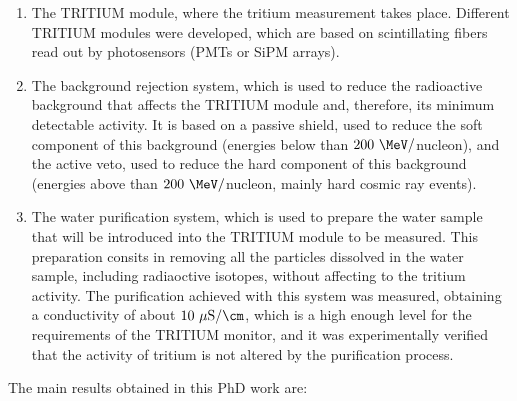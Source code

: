\begin{enumerate}

\item{} The TRITIUM module, where the tritium measurement takes place. Different TRITIUM modules were developed, which are based on scintillating fibers read out by photosensors (PMTs or SiPM arrays).

\item{} The background rejection system, which is used to reduce the radioactive background that affects the TRITIUM module and, therefore, its minimum detectable activity. It is based on a passive shield, used to reduce the soft component of this background (energies below than $200~\MeV/$nucleon), and the active veto, used to reduce the hard component of this background (energies above than $200~\MeV/$nucleon, mainly hard cosmic ray events).

\item{} The water purification system, which is used to prepare the water sample that will be introduced into the TRITIUM module to be measured. This preparation consits in removing all the particles dissolved in the water sample, including radiaoctive isotopes, without affecting to the tritium activity. The purification achieved with this system was measured, obtaining a conductivity of about $10~\mu\text{S}/\cm$, which is a high enough level for the requirements of the TRITIUM monitor, and it was experimentally verified that the activity of tritium is not altered by the purification process.

\end{enumerate} 
The main results obtained in this PhD work are:
